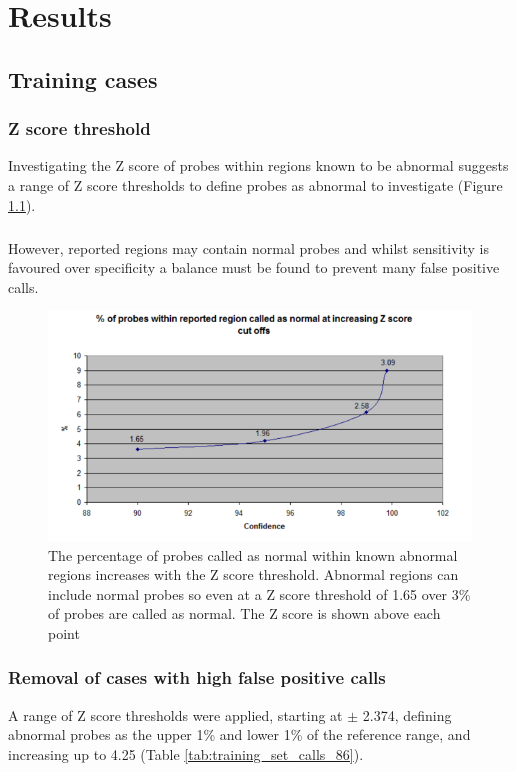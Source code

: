\chapter{Results}\label{ch:Results} 
\section{Training cases}
\subsection{Z score threshold}
Investigating the Z score of probes within regions known to be abnormal suggests a range of Z score thresholds to define probes as abnormal  to investigate (Figure \ref{fig:probeswithinreportedregion}). 
\paragraph*{}
However, reported regions may contain normal probes and whilst sensitivity is favoured over specificity a balance must be found to prevent many false positive calls.

\begin{figure}[h]
\centering
\includegraphics[width=0.9\linewidth]{./Figures/probeswithinreportedregion}
\caption[The number of probes classified as normal within known regions of CNV at a range of Z score thresholds]{The percentage of probes called as normal within known abnormal regions increases with the Z score threshold. Abnormal regions can include normal probes so even at a Z score threshold of 1.65 over 3\% of probes are called as normal. The Z score is shown above each point}
\label{fig:probeswithinreportedregion}
\end{figure}


\subsection{Removal of cases with high false positive calls}
A range of Z score thresholds were applied, starting at $\pm  $ 2.374,  defining abnormal probes as the upper 1\% and lower 1\% of the reference range, and increasing up to 4.25 (Table \ref{tab:training_set_calls_86}).

